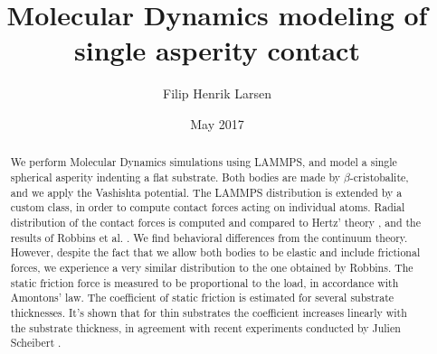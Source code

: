 \documentclass[twoside,english]{uiofysmaster}
\author{Filip Henrik Larsen}
\title{Molecular Dynamics modeling of single asperity contact}
\date{May 2017}
\begin{document}
\maketitle

\begin{abstract}
We perform Molecular Dynamics simulations using LAMMPS, and model a single spherical asperity indenting a flat substrate.
Both bodies are made by $\beta$-cristobalite, and we apply the Vashishta potential.
The LAMMPS distribution is extended by a custom class, in order to compute contact forces acting on individual atoms.  
Radial distribution of the contact forces is computed and compared to Hertz' theory \cite{Johnson1985}, and the results of Robbins et al. \cite{RobbinsSingleAsperity}. 
We find behavioral differences from the continuum theory. 
However, despite the fact that we allow both bodies to be elastic and include frictional forces, we experience a very similar distribution to the one obtained by Robbins. 
The static friction force is measured to be proportional to the load, in accordance with Amontons' law.
The coefficient of static friction is estimated for several substrate thicknesses. 
It's shown that for thin substrates the coefficient increases linearly with the substrate thickness, in agreement with recent experiments conducted by Julien Scheibert \cite{Scheibert2017}.




   
\end{abstract}
\end{document}
